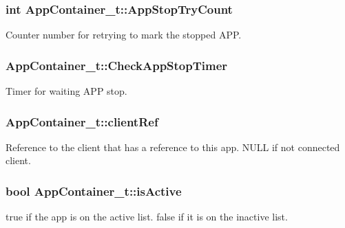 \subsubsection[{\texorpdfstring{App\+Stop\+Try\+Count}{AppStopTryCount}}]{\setlength{\rightskip}{0pt plus 5cm}int App\+Container\+\_\+t\+::\+App\+Stop\+Try\+Count}\hypertarget{struct_app_container__t_a92806623f5991efa2af0d9fe6a3cdb65}{}\label{struct_app_container__t_a92806623f5991efa2af0d9fe6a3cdb65}


Counter number for retrying to mark the stopped A\+PP. 

\subsubsection[{\texorpdfstring{Check\+App\+Stop\+Timer}{CheckAppStopTimer}}]{ App\+Container\+\_\+t\+::\+Check\+App\+Stop\+Timer}\hypertarget{struct_app_container__t_a524e4b450641e567c38b3a9e0c5144ff}{}\label{struct_app_container__t_a524e4b450641e567c38b3a9e0c5144ff}


Timer for waiting A\+PP stop. 

\subsubsection[{\texorpdfstring{client\+Ref}{clientRef}}]{ App\+Container\+\_\+t\+::client\+Ref}\hypertarget{struct_app_container__t_a95c59bd17484cf177ede849eb5586937}{}\label{struct_app_container__t_a95c59bd17484cf177ede849eb5586937}
Reference to the client that has a reference to this app. N\+U\+LL if not connected client. 
\subsubsection[{\texorpdfstring{is\+Active}{isActive}}]{\setlength{\rightskip}{0pt plus 5cm}bool App\+Container\+\_\+t\+::is\+Active}\hypertarget{struct_app_container__t_aae9312f13cc0f0ecfa514557a037a3a1}{}\label{struct_app_container__t_aae9312f13cc0f0ecfa514557a037a3a1}
true if the app is on the active list. false if it is on the inactive list. 

